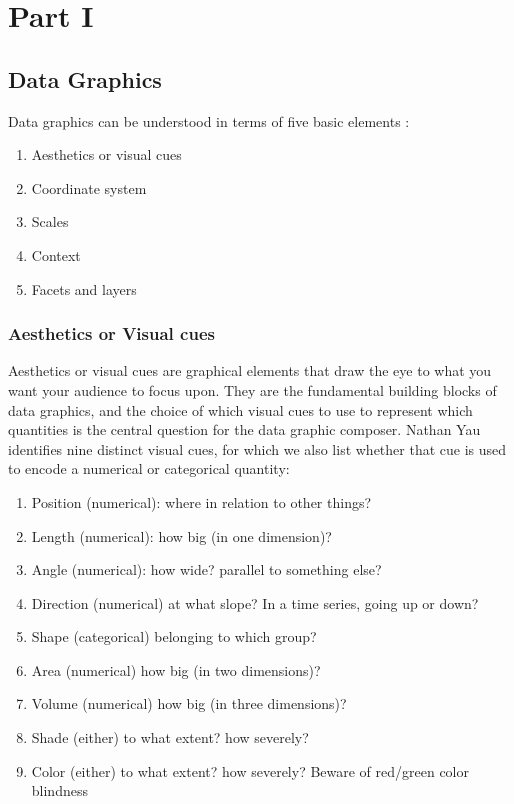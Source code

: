 \documentclass[]{book}
\providecommand{\tightlist}{%
  \setlength{\itemsep}{0pt}\setlength{\parskip}{0pt}}
\providecommand{\tightlist}{%
  \setlength{\itemsep}{0pt}\setlength{\parskip}{0pt}}
\theoremstyle{definition}
\theoremstyle{definition}
\theoremstyle{definition}
\theoremstyle{remark}
\begin{document}
\part{Part I}\label{part-part-i}

\chapter{Data Graphics}\label{data-graphics}

Data graphics can be understood in terms of five basic elements
\citep{baumer2017mdsr}:

\begin{enumerate}
\def\labelenumi{\arabic{enumi}.}
\tightlist
\item
  Aesthetics or visual cues
\item
  Coordinate system
\item
  Scales
\item
  Context
\item
  Facets and layers
\end{enumerate}

\section{Aesthetics or Visual cues}\label{aesthetics-or-visual-cues}

Aesthetics or visual cues are graphical elements that draw the eye to
what you want your audience to focus upon. They are the fundamental
building blocks of data graphics, and the choice of which visual cues to
use to represent which quantities is the central question for the data
graphic composer. Nathan Yau identifies nine distinct visual cues, for
which we also list whether that cue is used to encode a numerical or
categorical quantity:

\begin{enumerate}
\def\labelenumi{\arabic{enumi}.}
\tightlist
\item
  Position (numerical): where in relation to other things?
\item
  Length (numerical): how big (in one dimension)?
\item
  Angle (numerical): how wide? parallel to something else?
\item
  Direction (numerical) at what slope? In a time series, going up or
  down?
\item
  Shape (categorical) belonging to which group?
\item
  Area (numerical) how big (in two dimensions)?
\item
  Volume (numerical) how big (in three dimensions)?
\item
  Shade (either) to what extent? how severely?
\item
  Color (either) to what extent? how severely? Beware of red/green color
  blindness
\end{enumerate}
\end{document}
